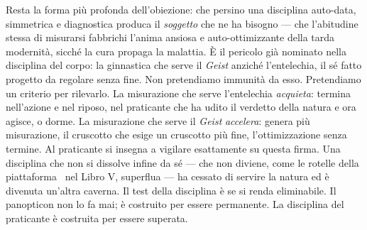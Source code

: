 Resta la forma pi\`u profonda dell'obiezione: che persino una disciplina
auto-data, simmetrica e diagnostica produca il \emph{soggetto} che ne ha bisogno
--- che l'abitudine stessa di misurarsi fabbrichi l'anima ansiosa e
auto-ottimizzante della tarda modernit\`a, sicch\'e la cura propaga la malattia.
\`E il pericolo gi\`a nominato nella disciplina del corpo: la ginnastica che
serve il \emph{Geist} anzich\'e l'entelechia, il s\'e fatto progetto da regolare
senza fine. Non pretendiamo immunit\`a da esso. Pretendiamo un criterio per
rilevarlo. La misurazione che serve l'entelechia \emph{acquieta}: termina
nell'azione e nel riposo, nel praticante che ha udito il verdetto della natura e
ora agisce, o dorme. La misurazione che serve il \emph{Geist} \emph{accelera}:
genera pi\`u misurazione, il cruscotto che esige un cruscotto pi\`u fine,
l'ottimizzazione senza termine. Al praticante si insegna a vigilare esattamente
su questa firma. Una disciplina che non si dissolve infine da s\'e --- che non
diviene, come le rotelle della piattaforma \praxis\ nel Libro V, superflua --- ha
cessato di servire la natura ed \`e divenuta un'altra caverna. Il test della
disciplina \`e se si renda eliminabile. Il panopticon non lo fa mai; \`e
costruito per essere permanente. La disciplina del praticante \`e costruita per
essere superata.
